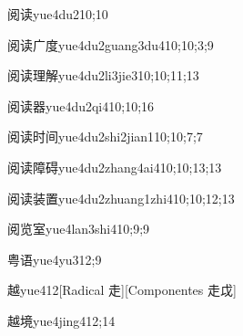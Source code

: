 \begin{verbete}{阅读}{yue4du2}{10;10}
\end{verbete}

\begin{verbete}{阅读广度}{yue4du2guang3du4}{10;10;3;9}
\end{verbete}

\begin{verbete}{阅读理解}{yue4du2li3jie3}{10;10;11;13}
\end{verbete}

\begin{verbete}{阅读器}{yue4du2qi4}{10;10;16}
\end{verbete}

\begin{verbete}{阅读时间}{yue4du2shi2jian1}{10;10;7;7}
\end{verbete}

\begin{verbete}{阅读障碍}{yue4du2zhang4ai4}{10;10;13;13}
\end{verbete}

\begin{verbete}{阅读装置}{yue4du2zhuang1zhi4}{10;10;12;13}
\end{verbete}

\begin{verbete}{阅览室}{yue4lan3shi4}{10;9;9}
\end{verbete}

\begin{verbete}{粤语}{yue4yu3}{12;9}
\end{verbete}

\begin{verbete}{越}{yue4}{12}[Radical 走][Componentes 走戉]
\end{verbete}

\begin{verbete}{越境}{yue4jing4}{12;14}
\end{verbete}

